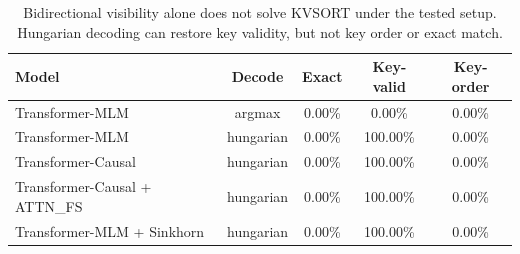 \begin{table}[t]
\centering
\small
\caption{Bidirectional visibility alone does not solve KVSORT under the tested setup. Hungarian decoding can restore key validity, but not key order or exact match.}
\label{tab:synthetic-transformer-main}
\begin{tabular}{lcccc}
\toprule
Model & Decode & Exact & Key-valid & Key-order \\
\midrule
Transformer-MLM & argmax & 0.00\% & 0.00\% & 0.00\% \\
Transformer-MLM & hungarian & 0.00\% & 100.00\% & 0.00\% \\
Transformer-Causal & hungarian & 0.00\% & 100.00\% & 0.00\% \\
Transformer-Causal + ATTN\_FS & hungarian & 0.00\% & 100.00\% & 0.00\% \\
Transformer-MLM + Sinkhorn & hungarian & 0.00\% & 100.00\% & 0.00\% \\
\bottomrule
\end{tabular}
\end{table}
